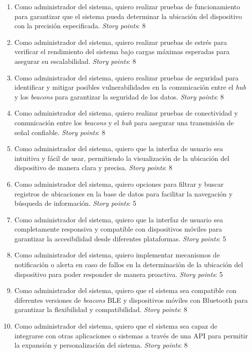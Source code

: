\documentclass[
11pt, %
]{charter}
\begin{document}
\begin{enumerate}
	\item Como administrador del sistema, quiero realizar pruebas de funcionamiento para garantizar que el sistema pueda determinar la ubicación del dispositivo con la precisión especificada. \textit{Story points}: 8
	\item Como administrador del sistema, quiero realizar pruebas de estrés para verificar el rendimiento del sistema bajo cargas máximas esperadas para asegurar su escalabilidad. \textit{Story points}: 8
	\item Como administrador del sistema, quiero realizar pruebas de seguridad para identificar y mitigar posibles vulnerabilidades en la comunicación entre el \textit{hub} y los \textit{beacons} para garantizar la seguridad de los datos. \textit{Story points}: 8
	\item Como administrador del sistema, quiero realizar pruebas de conectividad y comunicación entre los \textit{beacons} y el \textit{hub} para asegurar una transmisión de señal confiable. \textit{Story points}: 8
	\item Como administrador del sistema, quiero que la interfaz de usuario sea intuitiva y fácil de usar, permitiendo la visualización de la ubicación del dispositivo de manera clara y precisa. \textit{Story points}: 8
	\item Como administrador del sistema, quiero opciones para filtrar y buscar registros de ubicaciones en la base de datos para facilitar la navegación y búsqueda de información. \textit{Story points}: 5
	\item Como administrador del sistema, quiero que la interfaz de usuario sea completamente responsiva y compatible con dispositivos móviles para garantizar la accesibilidad desde diferentes plataformas. \textit{Story points}: 5
	\item Como administrador del sistema, quiero implementar mecanismos de notificación o alerta en caso de fallos en la determinación de la ubicación del dispositivo para poder responder de manera proactiva. \textit{Story points}: 5
	\item Como administrador del sistema, quiero que el sistema sea compatible con diferentes versiones de \textit{beacons} BLE y dispositivos móviles con Bluetooth para garantizar la flexibilidad y compatibilidad. \textit{Story points}: 8
	\item Como administrador del sistema, quiero que el sistema sea capaz de integrarse con otras aplicaciones o sistemas a través de una API para permitir la expansión y personalización del sistema. \textit{Story points}: 8

\end{enumerate}
\end{document}
